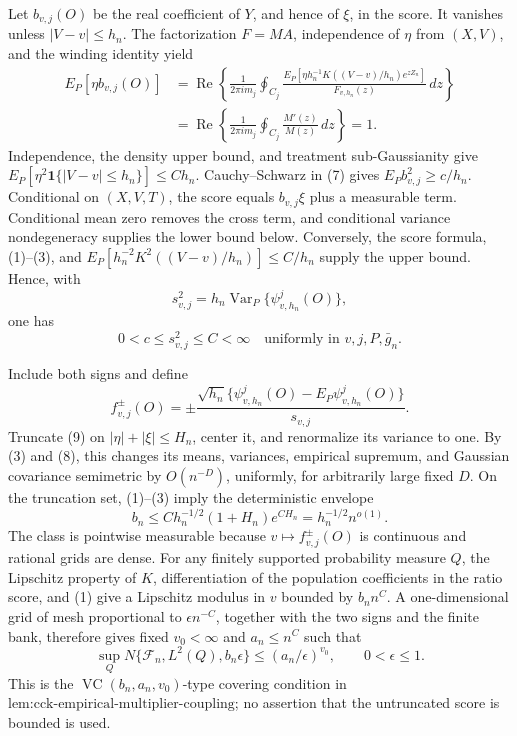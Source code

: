 Let \(b_{v,j}(O)\) be the real coefficient of \(Y\), and hence of \(\xi\), in the score. It vanishes unless \(|V-v|\le h_n\). The factorization \(F=MA\), independence of \(\eta\) from \((X,V)\), and the winding identity yield
\[
 \begin{aligned}
 E_P[\eta b_{v,j}(O)]
 &=\operatorname{Re}\left\{\frac1{2\pi i m_j}\oint_{C_j}
 \frac{E_P[\eta h_n^{-1}K((V-v)/h_n)e^{zZ_n}]}{F_{v,h_n}(z)}\,dz\right\}\\
 &=\operatorname{Re}\left\{\frac1{2\pi i m_j}\oint_{C_j}\frac{M'(z)}{M(z)}\,dz\right\}=1.
 \end{aligned} \tag{7}
\]
Independence, the density upper bound, and treatment sub-Gaussianity give \(E_P[\eta^2\mathbf 1\{|V-v|\le h_n\}]\le Ch_n\). Cauchy--Schwarz in (7) gives \(E_Pb_{v,j}^2\ge c/h_n\). Conditional on \((X,V,T)\), the score equals \(b_{v,j}\xi\) plus a measurable term. Conditional mean zero removes the cross term, and conditional variance nondegeneracy supplies the lower bound below. Conversely, the score formula, (1)--(3), and \(E_P[h_n^{-2}K^2((V-v)/h_n)]\le C/h_n\) supply the upper bound. Hence, with
\[
 s_{v,j}^2=h_n\operatorname{Var}_P\{\psi^j_{v,h_n}(O)\},
\]
one has
\[
 0<c\le s_{v,j}^2\le C<\infty
 \quad\text{uniformly in }v,j,P,\bar g_n. \tag{8}
\]

Include both signs and define
\[
 f_{v,j}^{\pm}(O)=\pm
 \frac{\sqrt{h_n}\{\psi^j_{v,h_n}(O)-E_P\psi^j_{v,h_n}(O)\}}{s_{v,j}}. \tag{9}
\]
Truncate (9) on \(|\eta|+|\xi|\le H_n\), center it, and renormalize its variance to one. By (3) and (8), this changes its means, variances, empirical supremum, and Gaussian covariance semimetric by \(O(n^{-D})\), uniformly, for arbitrarily large fixed \(D\). On the truncation set, (1)--(3) imply the deterministic envelope
\[
 b_n\le Ch_n^{-1/2}(1+H_n)e^{CH_n}
 =h_n^{-1/2}n^{o(1)}. \tag{10}
\]
The class is pointwise measurable because \(v\mapsto f_{v,j}^{\pm}(O)\) is continuous and rational grids are dense. For any finitely supported probability measure \(Q\), the Lipschitz property of \(K\), differentiation of the population coefficients in the ratio score, and (1) give a Lipschitz modulus in \(v\) bounded by \(b_nn^C\). A one-dimensional grid of mesh proportional to \(\epsilon n^{-C}\), together with the two signs and the finite bank, therefore gives fixed \(v_0<\infty\) and \(a_n\le n^C\) such that
\[
 \sup_QN\{\mathcal F_n,L^2(Q),b_n\epsilon\}
 \le(a_n/\epsilon)^{v_0},
 \qquad 0<\epsilon\le1. \tag{11}
\]
This is the \(\operatorname{VC}(b_n,a_n,v_0)\)-type covering condition in \(\text{lem:cck-empirical-multiplier-coupling}\); no assertion that the untruncated score is bounded is used.

